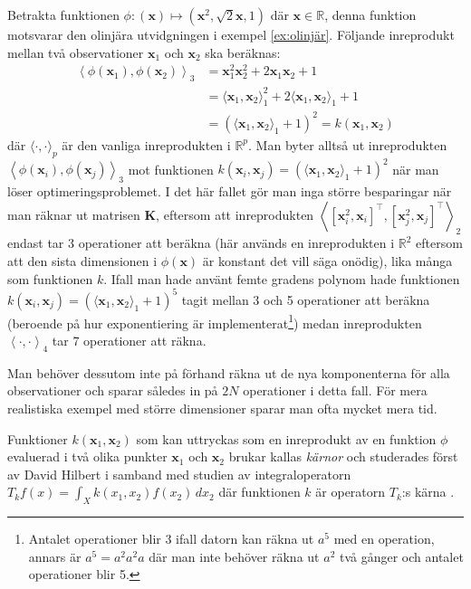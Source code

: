 \documentclass[a4paper, 12pt]{report}
\theoremstyle{definition}
\theoremstyle{remark}
\newcommand{\bfx}{\mathbf{x}}
\newcommand{\llangle}{\left\langle}
\newcommand{\rrangle}{\right\rangle}
\newcommand{\inner}[2]{\llangle #1, #2 \rrangle}
\begin{document}
	Betrakta funktionen $\phi:\left(\bfx\right)\longmapsto \left(\bfx^2,\sqrt{2}\bfx, 1\right)$ där $\bfx\in\mathbb{R}$, denna funktion motsvarar den olinjära utvidgningen i exempel \ref{ex:olinjär}. Följande inreprodukt mellan två observationer $\mathbf{x}_1$ och $\mathbf{x}_2$ ska beräknas:
	\begin{align*}
	\left\langle \phi\left(\mathbf{x}_1\right), \phi\left(\mathbf{x}_2\right) \right\rangle_3 &= \bfx_1^2\bfx_2^2 + 2\bfx_1\bfx_2 + 1\\
	&= \langle \bfx_1, \bfx_2 \rangle_1^2 + 2\langle \bfx_1, \bfx_2 \rangle_1 + 1\\
	&= \left(\langle\bfx_1, \bfx_2 \rangle_1 + 1\right)^2 = k\left(\bfx_1, \bfx_2\right)
	\end{align*}
	där $\langle \cdot, \cdot \rangle_p$ är den vanliga inreprodukten i $\mathbb{R}^p$. Man byter alltså ut inreprodukten $\inner{\phi\left(\bfx_i\right)}{\phi\left(\bfx_j\right)}_3$ mot funktionen $k\left(\bfx_i, \bfx_j\right)=\left(\langle\bfx_1, \bfx_2 \rangle_1 + 1\right)^2$ när man löser optimeringsproblemet. I det här fallet gör man inga större besparingar när man räknar ut matrisen $\mathbf{K}$, eftersom att inreprodukten $\inner{[\bfx_i^2, \bfx_i]^\intercal}{[\bfx_j^2, \bfx_j]^\intercal}_2$ endast tar 3 operationer att beräkna (här används en inreprodukten i $\mathbb{R}^2$  eftersom att den sista dimensionen i $\phi(\bfx)$ är konstant det vill säga onödig), lika många som funktionen $k$. Ifall man hade använt femte gradens polynom hade funktionen $k\left(\bfx_i, \bfx_j\right)=\left(\langle\bfx_1, \bfx_2 \rangle_1 + 1\right)^5$ tagit mellan 3 och 5 operationer att beräkna (beroende på hur exponentiering är implementerat\footnote{Antalet operationer blir 3 ifall datorn kan räkna ut $a^5$ med en operation, annars är $a^5=a^2a^2a$ där man inte behöver räkna ut $a^2$ två gånger och antalet operationer blir 5.}) medan inreprodukten $\inner{\cdot}{\cdot}_4$ tar 7 operationer att räkna.
	
	Man behöver dessutom inte på förhand räkna ut de nya komponenterna för alla observationer och sparar således in på $2N$ operationer i detta fall. För mera realistiska exempel med större dimensioner sparar man ofta mycket mera tid.

Funktioner $k\left(\bfx_1, \bfx_2\right)$ som kan uttryckas som en inreprodukt av en funktion $\phi$ evaluerad i två olika punkter $\bfx_1$ och $\bfx_2$ brukar kallas \emph{kärnor} och studerades först av David Hilbert \cite{Hilbert} i samband med studien av integraloperatorn $T_k f\left(x\right)=\int_{X}k\left(x_1, x_2\right)f\left(x_2\right)\,dx_2$ där funktionen $k$ är operatorn $T_k$:s kärna \cite{LearningKernels}.
\end{document}
